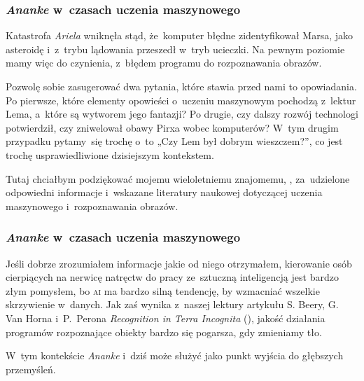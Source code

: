 \documentclass[10pt,t]{beamer}
\begin{document}
\begin{frame}
  \frametitle{\textit{Ananke} w~czasach uczenia maszynowego}


  Katastrofa \textit{Ariela} wniknęła stąd, że~komputer błędne
  zidentyfikował Marsa, jako asteroidę i~z~trybu lądowania przeszedł
  w~tryb ucieczki. Na pewnym poziomie mamy więc do czynienia, z~błędem
  programu do rozpoznawania obrazów.

  Pozwolę sobie zasugerować dwa pytania, które stawia przed nami to
  opowiadania. Po pierwsze, które elementy opowieści o~uczeniu maszynowym
  pochodzą z~lektur Lema, a~które są wytworem jego fantazji? Po drugie,
  czy dalszy rozwój technologi potwierdził, czy zniwelował obawy Pirxa
  wobec komputerów? W~tym drugim przypadku pytamy~się trochę o~to „Czy
  Lem był dobrym wieszczem?”, co jest trochę usprawiedliwione dzisiejszym
  kontekstem.

  Tutaj chciałbym podziękować mojemu wieloletniemu znajomemu,
  ,
  za~udzielone odpowiedni informacje i~wskazane literatury naukowej
  dotyczącej uczenia maszynowego i~rozpoznawania obrazów.

\end{frame}





\begin{frame}
  \frametitle{\textit{Ananke} w~czasach uczenia maszynowego}


  Jeśli dobrze zrozumiałem informacje jakie od niego otrzymałem,
  kierowanie osób cierpiących na nerwicę natręctw do pracy ze~sztuczną
  inteligencją jest bardzo złym pomysłem, bo \textsc{ai} ma bardzo silną
  tendencję, by wzmacniać wszelkie skrzywienie w~danych. Jak zaś wynika
  z~naszej lektury artykułu S. Beery, G. Van Horna i~P.~Perona
  {\textit{Recognition in Terra Incognita}}
  (\parencite{Beery-Horn-Perona-Recognition-in-Terra-Incognita-Pub-2018}),
  jakość działania programów rozpoznające obiekty bardzo się pogarsza, gdy
  zmieniamy tło.

  W~tym kontekście \textit{Ananke} i~dziś może służyć jako punkt wyjścia
  do głębszych przemyśleń.

\end{frame}
\end{document}
